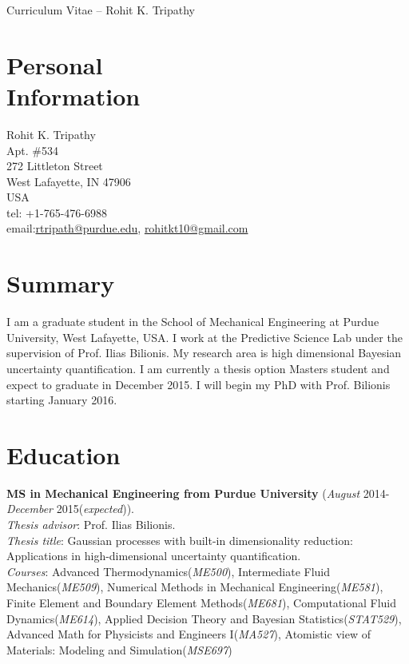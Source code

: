 \documentclass[margin,line,a4paper]{resume}
\begin{document}
{\sc \Large Curriculum Vitae -- Rohit K. Tripathy}
\begin{resume}
    \vspace{0.5cm}




    \section{\mysidestyle Personal\\Information}%
    Rohit K. Tripathy \\
    Apt. \#534  \\ 
    272 Littleton Street \\ 
    West Lafayette, IN 47906 \\
    USA \\ 
    tel: +1-765-476-6988 \\
    email:\href{mailto:rtripath@purdue.edu}{rtripath@purdue.edu}, \href{mailto:rohitkt10@gmail.com}{rohitkt10@gmail.com} \\
    



    \section{\mysidestyle Summary}
    I am a graduate student in the School of Mechanical Engineering at Purdue University, West Lafayette, USA. I work at the Predictive Science Lab under the supervision of Prof. Ilias Bilionis. My research area is high dimensional Bayesian uncertainty quantification. I am currently a thesis option Masters student and expect to graduate in December 2015. I will begin my PhD with Prof. Bilionis starting January 2016.



    \section{\mysidestyle Education} \textbf{MS in Mechanical Engineering from
    Purdue University} (\textit{August} 2014-\textit{December} 2015(\emph{expected})). \\
    \textit{Thesis advisor}: Prof. Ilias Bilionis. \\
    \textit{Thesis title}: Gaussian processes with built-in dimensionality reduction: Applications in high-dimensional uncertainty quantification. \\
    \textit{Courses}: Advanced Thermodynamics(\textit{ME500}),  Intermediate Fluid Mechanics(\textit{ME509}),  Numerical Methods in Mechanical Engineering(\textit{ME581}),  Finite Element and Boundary Element Methods(\textit{ME681}),  Computational Fluid Dynamics(\textit{ME614}),  Applied Decision Theory and Bayesian Statistics(\textit{STAT529}),  Advanced Math for Physicists and Engineers I(\textit{MA527}),  Atomistic view of Materials: Modeling and Simulation(\textit{MSE697})


\end{resume}
\end{document}
